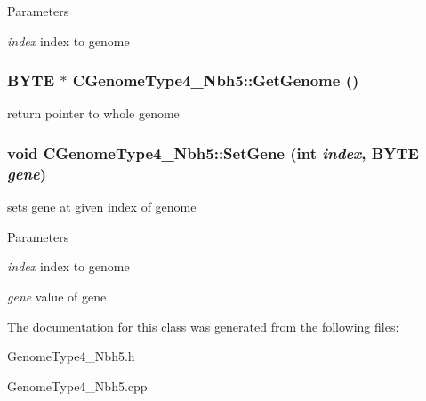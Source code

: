 \begin{DoxyParams}{Parameters}
\item[{\em index}]index to genome \end{DoxyParams}
\hypertarget{classCGenomeType4__Nbh5_a537e675ab4f3d5d9455c0aa458975674}{
\subsubsection[{GetGenome}]{\setlength{\rightskip}{0pt plus 5cm}BYTE $\ast$ CGenomeType4\_\-Nbh5::GetGenome ()}}
\label{classCGenomeType4__Nbh5_a537e675ab4f3d5d9455c0aa458975674}
return pointer to whole genome \hypertarget{classCGenomeType4__Nbh5_a70b89c7c7cc3322542ce3f5893de6e5b}{
\subsubsection[{SetGene}]{\setlength{\rightskip}{0pt plus 5cm}void CGenomeType4\_\-Nbh5::SetGene (int {\em index}, \/  BYTE {\em gene})}}
\label{classCGenomeType4__Nbh5_a70b89c7c7cc3322542ce3f5893de6e5b}
sets gene at given index of genome


\begin{DoxyParams}{Parameters}
\item[{\em index}]index to genome \item[{\em gene}]value of gene \end{DoxyParams}


The documentation for this class was generated from the following files:\begin{DoxyCompactItemize}
\item 
GenomeType4\_\-Nbh5.h\item 
GenomeType4\_\-Nbh5.cpp\end{DoxyCompactItemize}
